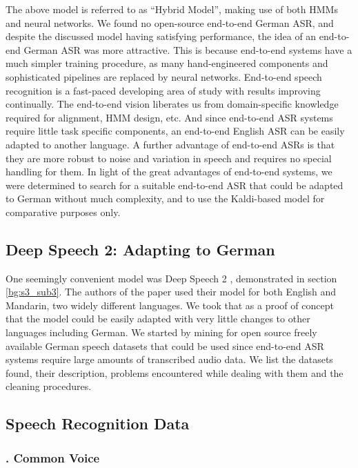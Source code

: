 The above model \cite{milde2018open} is referred to as \enquote{Hybrid Model}, making use of both \ac{HMM}s and neural networks. We found no open-source end-to-end German \ac{ASR}, and despite the discussed model \cite{milde2018open} having satisfying performance, the idea of an end-to-end German \ac{ASR} was more attractive. This is because end-to-end systems have a much simpler training procedure, as many hand-engineered components and sophisticated pipelines are replaced by neural networks. End-to-end speech recognition is a fast-paced developing area of study with results improving continually. The end-to-end vision liberates us from domain-specific knowledge required for alignment, \ac{HMM} design, etc. And since end-to-end \ac{ASR} systems require little task specific components, an end-to-end English \ac{ASR} can be easily adapted to another language. A further advantage of end-to-end \ac{ASR}s is that they are more robust to noise and variation in speech and requires no special handling for them. In light of the great advantages of end-to-end systems, we were determined to search for a suitable end-to-end \ac{ASR} that could be adapted to German without much complexity, and to use the Kaldi-based model \cite{milde2018open} for comparative purposes only.

\subsection{Deep Speech 2: Adapting to German}
\label{meth:s2_sub3}

One seemingly convenient model was Deep Speech 2 \cite{amodei2016deep}, demonstrated in section \ref{bg:s3_sub3}. The authors of the paper used their model for both English and Mandarin, two widely different languages. We took that as a proof of concept that the model could be easily adapted with very little changes to other languages including German. We started by mining for open source freely available German speech datasets that could be used since end-to-end \ac{ASR} systems require large amounts of transcribed audio data. We list the datasets found, their description, problems encountered while dealing with them and the cleaning procedures.


\subsection{Speech Recognition Data}
\label{meth:s2_sub4}

\subsubsection{. Common Voice}
\label{meth:s2_sub4_subsub1}


